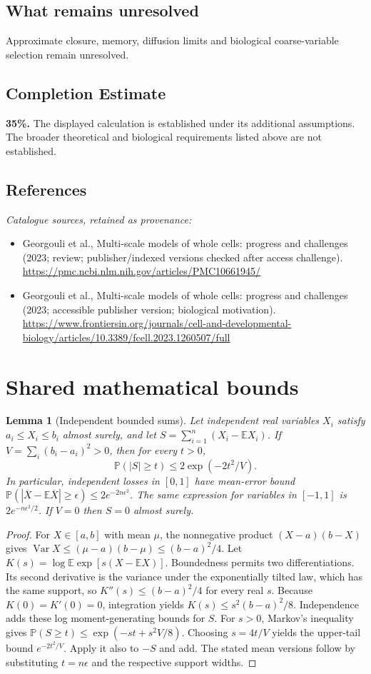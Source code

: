 \documentclass[11pt]{article}
\newcommand{\E}{\mathbb E}
\newcommand{\Prob}{\mathbb P}
\DeclareMathOperator{\Var}{Var}
\providecommand{\E}{\mathbb E}
\providecommand{\Prob}{\mathbb P}
\providecommand{\Var}{\operatorname{Var}}
\newtheorem{sharedlemma}{Lemma}[section]
\begin{document}
\subsection{What remains unresolved}
Approximate closure, memory, diffusion limits and biological coarse-variable selection remain unresolved.
\subsection{Completion Estimate}
\textbf{35\%.} The displayed calculation is established under its additional assumptions. The broader theoretical and biological requirements listed above are not established.
\subsection{References}
\noindent\emph{Catalogue sources, retained as provenance:}
\begin{itemize}
\item Georgouli et al., Multi-scale models of whole cells: progress and challenges (2023; review; publisher/indexed versions checked after access challenge). \url{https://pmc.ncbi.nlm.nih.gov/articles/PMC10661945/}
\item Georgouli et al., Multi-scale models of whole cells: progress and challenges (2023; accessible publisher version; biological motivation). \url{https://www.frontiersin.org/journals/cell-and-developmental-biology/articles/10.3389/fcell.2023.1260507/full}
\end{itemize}
\clearpage


\appendix
\section{Shared mathematical bounds}\label{app:bounds}
\begin{sharedlemma}[Independent bounded sums]\label{lem:bounded}
Let independent real variables $X_i$ satisfy $a_i\leq X_i\leq b_i$ almost surely,
and let $S=\sum_{i=1}^n(X_i-\E X_i)$. If
$V=\sum_i(b_i-a_i)^2>0$, then for every $t>0$,
\[
 \Prob(|S|\geq t)\leq 2\exp(-2t^2/V).
\]
In particular, independent losses in $[0,1]$ have mean-error bound
$\Prob(|\overline X-\E\overline X|\geq\epsilon)
\leq2e^{-2n\epsilon^2}$. The same expression for variables in $[-1,1]$
is $2e^{-n\epsilon^2/2}$. If $V=0$ then $S=0$ almost surely.
\end{sharedlemma}
\begin{proof}
For $X\in[a,b]$ with mean $\mu$, the nonnegative product
$(X-a)(b-X)$ gives
$\Var X\leq(\mu-a)(b-\mu)\leq(b-a)^2/4$.
Let $K(s)=\log\E\exp[s(X-\E X)]$.
Boundedness permits two differentiations. Its second derivative is the variance
under the exponentially tilted law, which has the same support, so
$K''(s)\leq(b-a)^2/4$ for every real $s$.
Because $K(0)=K'(0)=0$, integration yields
$K(s)\leq s^2(b-a)^2/8$.
Independence adds these log moment-generating bounds for $S$.
For $s>0$, Markov's inequality gives
$\Prob(S\geq t)\leq\exp(-st+s^2V/8)$.
Choosing $s=4t/V$ yields the upper-tail bound $e^{-2t^2/V}$.
Apply it also to $-S$ and add. The stated mean versions follow by substituting
$t=n\epsilon$ and the respective support widths.
\end{proof}
\end{document}
